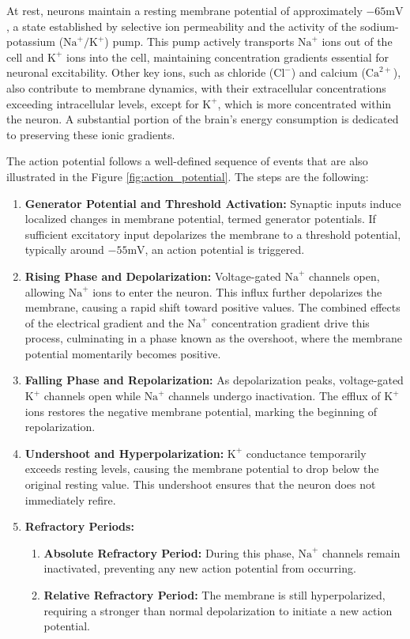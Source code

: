 At rest, neurons maintain a resting membrane potential of approximately $-65 \text{mV}$, a
state established by selective ion permeability and the activity of the sodium-potassium 
($\text{Na}^{+}/\text{K}^{+}$) pump. This pump actively transports $\text{Na}^{+}$ ions 
out of the cell and $\text{K}^{+}$ 
ions into the cell, maintaining concentration gradients essential for neuronal excitability. Other
key ions, such as chloride ($\text{Cl}^{-}$) and calcium ($\text{Ca}^{2+}$), also contribute to membrane dynamics, 
with their extracellular concentrations exceeding intracellular levels, except for $\text{K}^{+}$, which
is more concentrated within the neuron. A substantial portion of the brain's energy
consumption is dedicated to preserving these ionic gradients.

The action potential follows a well-defined sequence of events that are also illustrated in the Figure \ref{fig:action_potential}. The steps are the following:

\begin{enumerate}
    \item \textbf{Generator Potential and Threshold Activation:} Synaptic inputs induce localized changes in membrane potential, termed generator potentials. If sufficient excitatory input depolarizes the membrane to a threshold potential, typically around $-55 \text{mV}$, an action potential is triggered.
    \item \textbf{Rising Phase and Depolarization:} Voltage-gated $\text{Na}^{+}$ channels open, allowing $\text{Na}^{+}$ 
    ions to enter the neuron. This influx further depolarizes the membrane, causing a rapid shift toward positive values.
    The combined effects of the electrical gradient and the $\text{Na}^{+}$ concentration gradient drive this process, culminating in a phase known as the overshoot, where the membrane potential momentarily becomes positive.
    \item \textbf{Falling Phase and Repolarization:} As depolarization peaks, voltage-gated $\text{K}^{+}$ channels 
    open while $\text{Na}^{+}$ channels undergo inactivation. The efflux of $\text{K}^{+}$ ions restores the negative membrane potential, marking the beginning of repolarization.
    \item \textbf{Undershoot and Hyperpolarization:} $\text{K}^{+}$ conductance temporarily exceeds resting levels, causing the membrane potential to drop below the original resting value. This undershoot ensures that the neuron does not immediately refire.
    \item \textbf{Refractory Periods:}
    \begin{enumerate}
        \item \textbf{Absolute Refractory Period:} During this phase, $\text{Na}^{+}$ channels remain inactivated, preventing any 
        new action potential from occurring.
        \item \textbf{Relative Refractory Period:} The membrane is still hyperpolarized, requiring a stronger than normal depolarization to initiate a new action potential.
    \end{enumerate}
\end{enumerate}

